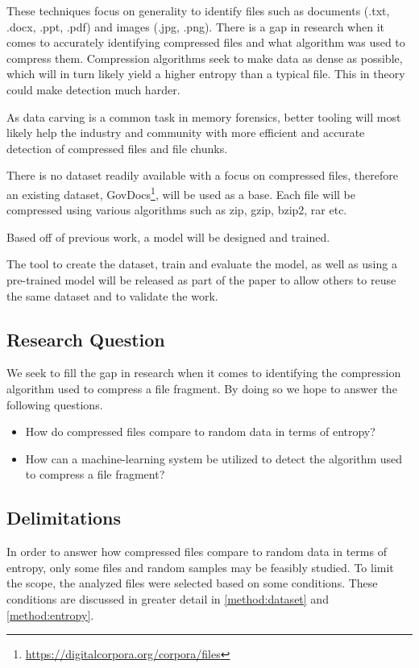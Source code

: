 \documentclass[conference]{IEEEtran}
\begin{document}
These techniques focus on generality to identify files such as documents (.txt, .docx, .ppt, .pdf) and images (.jpg, .png). There is a gap in research when it comes to accurately identifying compressed files and what algorithm was used to compress them. Compression algorithms seek to make data as dense as possible, which will in turn likely yield a higher entropy than a typical file. This in theory could make detection much harder\cite{PENROSE2013}.

As data carving is a common task in memory forensics, better tooling will most likely help the industry and community with more efficient and accurate detection of compressed files and file chunks.

There is no dataset readily available with a focus on compressed files, therefore an existing dataset, GovDocs\footnote{\href{https://digitalcorpora.org/corpora/files}{https://digitalcorpora.org/corpora/files}}, will be used as a base. Each file will be compressed using various algorithms such as zip, gzip, bzip2, rar etc.

Based off of previous work, a model will be designed and trained.

The tool to create the dataset, train and evaluate the model, as well as using a pre-trained model will be released as part of the paper to allow others to reuse the same dataset and to validate the work.

\subsection{Research Question}

We seek to fill the gap in research when it comes to identifying the compression algorithm used to compress a file fragment. By doing so we hope to answer the following questions.

\begin{itemize}
    \item How do compressed files compare to random data in terms of entropy?
    \item How can a machine-learning system be utilized to detect the algorithm used to compress a file fragment?
\end{itemize}

\subsection{Delimitations}

In order to answer how compressed files compare to random data in terms of entropy, only some files and random samples may be feasibly studied. To limit the scope, the analyzed files were selected based on some conditions. These conditions are discussed in greater detail in \ref{method:dataset} and \ref{method:entropy}.
\end{document}
